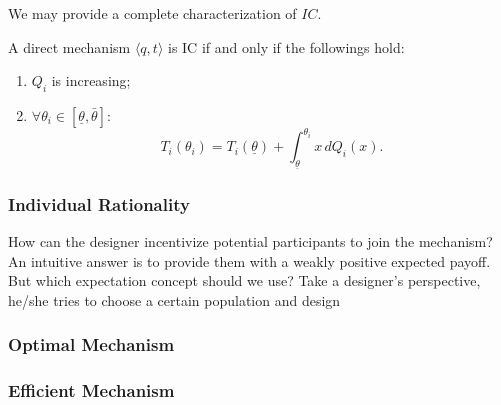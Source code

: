 We may provide a complete characterization of $IC$.
\begin{theorem}
    A direct mechanism $\langle q,t \rangle$ is IC if and only if the followings hold:
    \begin{enumerate}
        \item $Q_i$ is increasing;
        \item $\forall \theta_i\in [\underline{\theta},\bar{\theta}]$: $$T_i(\theta_i)=T_i(\underline{\theta})+\int_{\underline{\theta}}^{\theta_i}x \,d Q_i(x).$$
    \end{enumerate}
\end{theorem}
\subsubsection{Individual Rationality}
How can the designer incentivize potential participants to join the mechanism? An intuitive answer is to provide them with a weakly positive expected payoff.
But which expectation concept should we use? Take a designer's perspective, he/she tries to choose a certain population and design

\subsubsection{Optimal Mechanism}


\subsubsection{Efficient Mechanism}



